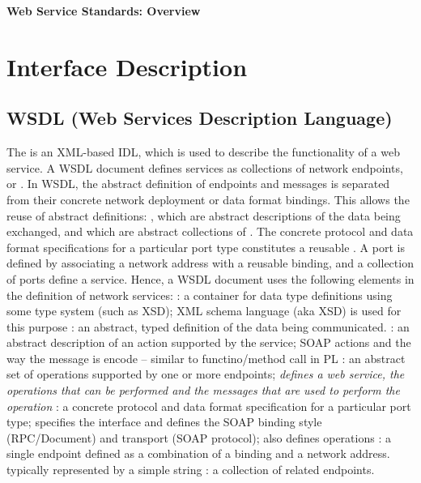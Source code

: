 \documentclass{note}
\begin{document}
\small


\begin{center}
 {\large\bf Web Service Standards: Overview}
\end{center}

\vspace*{1cm}

\tableofcontents

\section{Interface Description}
\subsection{WSDL (Web Services Description Language)}
The  is an \textcolor{red2}{XML-based IDL}, which is used to describe
the functionality of a web service. 
A WSDL document defines services as collections of network endpoints, or
. In WSDL, the abstract definition of endpoints and messages is
separated 
from their concrete network deployment or data format bindings. This allows
the reuse of abstract definitions: , which are abstract
descriptions 
of the data being exchanged, and  which are abstract
collections of 
. The concrete protocol and data format specifications for a
particular port type constitutes a reusable . A port is defined by
associating a network address with a reusable binding, and a collection of
ports define a service. Hence, a WSDL document uses the following elements in
the definition of network services: 
\bit
\w {}: a container for data type definitions using some type system
(such as XSD); XML schema language (aka XSD) is used for this purpose
\w {}: an abstract, typed definition of the data being communicated.
\w {}: an abstract description of an action supported by the
service; SOAP actions and the way the message is encode -- similar to
functino/method call  in PL
\w {}: an abstract set of operations supported by one or more
endpoints;  {\em defines a web service, the operations that can be performed
  and the messages that are used to perform the operation}
\w {}: a concrete protocol and data format specification for a
particular port type; specifies the interface and defines the SOAP binding
style (RPC/Document) and transport (SOAP protocol); also defines operations
\w {}:  a single endpoint defined as a combination of a
binding and a network address. typically represented by a simple 
string 
\w {}: a collection of related endpoints.
\eit
\end{document}
